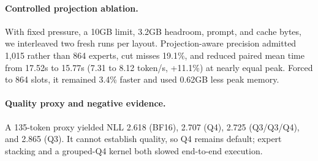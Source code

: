 \documentclass{article}
\begin{document}
\paragraph{Controlled projection ablation.}
With fixed pressure, a 10GB limit, 3.2GB headroom, prompt, and cache bytes, we
interleaved two fresh runs per layout. Projection-aware precision admitted
1,015 rather than 864 experts, cut misses 19.1\%, and reduced paired mean time
from 17.52s to 15.77s (7.31 to 8.12 token/s, +11.1\%) at nearly equal peak.
Forced to 864 slots, it remained 3.4\% faster and used 0.62GB less peak memory.

\paragraph{Quality proxy and negative evidence.}
A 135-token proxy yielded NLL 2.618 (BF16), 2.707 (Q4), 2.725 (Q3/Q3/Q4), and
2.865 (Q3). It cannot establish quality, so Q4 remains default; expert stacking
and a grouped-Q4 kernel both slowed end-to-end execution.



\end{document}
